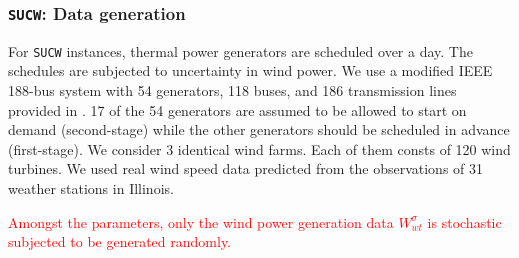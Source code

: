 

\subsubsection{\texttt{SUCW}: Data generation}
For \texttt{SUCW} instances, thermal power generators are scheduled over a day. The schedules are subjected to uncertainty in wind power. We use a modified IEEE 188-bus system with 54 generators, 118 buses, and 186 transmission lines provided in \cite{journal:LLMS2014}. 17 of the 54 generators are assumed to be allowed to start on demand (second-stage) while the other generators should be scheduled in advance (first-stage). We consider 3 identical wind farms. Each of them consts of  120 wind turbines. We used real wind speed data predicted from the observations of 31 weather stations in Illinois.

\textcolor{red}{Amongst the parameters, only the wind power generation data $W_{wt}^\sigma$ is stochastic subjected to be generated randomly.}